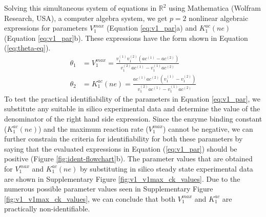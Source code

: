 \documentclass[10pt]{article}
\begin{document}
	Solving this simultaneous system of equations in $\mathbb{R}^2$ using Mathematica (Wolfram Research, USA), a computer algebra system, we get $p=2$ nonlinear algebraic expressions for parameters $V_1^{max}$ (Equation \ref{eq:v1_par}a) and $K_1^{ac}(ne)$ (Equation \ref{eq:v1_par}b). These expressions have the form shown in Equation (\ref{eq:theta-eq}).
	\begin{subequations}\label{eq:v1_par}
		\begin{align}		
		\theta_1 &= V_1^{max} = \frac{v_1^{(1)}v_1^{(2)}(ac^{(1)}-ac^{(2)})}{v_1^{(2)}ac^{(1)}-v_1^{(1)}ac^{(2)}}\\
		\theta_2 &= K_1^{ac}(ne) = \frac{ac^{(1)}ac^{(2)}(v_1^{(1)}-v_1^{(2)})}{v_1^{(2)}ac^{(1)}-v_1^{(1)}ac^{(2)}}
		\end{align}
	\end{subequations}
	To test the practical identifiability of the parameters in Equation \ref{eq:v1_par}, we substitute any suitable in silico experimental data and determine the value of the denominator of the right hand side expression. Since the enzyme binding constant ($K_1^{ac}(ne)$) and the maximum reaction rate ($V_1^{max}$) cannot be negative, we can further constrain the criteria for identifiability for both these parameters by saying that the evaluated expressions in Equation (\ref{eq:v1_par}) should be positive (Figure \ref{fig:ident-flowchart}b). The parameter values that are obtained for $V_1^{max}$ and $K_1^{ac} (ne)$ by substituting in silico steady state experimental data are shown in Supplementary Figure \ref{fig:v1_v1max_ck_values}. Due to the numerous possible parameter values seen in Supplementary Figure \ref{fig:v1_v1max_ck_values}, we can conclude that both $V_1^{max}$ and $K_1^{ac}$ are practically non-identifiable.
	
\end{document}
